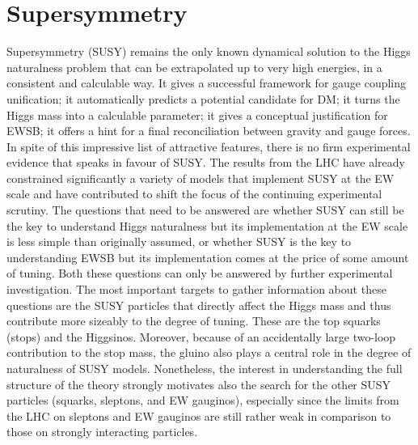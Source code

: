 \documentclass[../report.tex]{subfiles}
\begin{document}
\newcommand{\gl}{\ensuremath{\tilde{g}}}
\newcommand{\tone}{\ensuremath{\tilde{t}_1}}
\newcommand{\neut}{\ensuremath{\tilde{\chi}}}
\newcommand{\stopq}{\ensuremath{\tilde{t}}}
\newcommand{\chiOneZero}{\ensuremath{\tilde{\chi}_1^0}}
\newcommand{\chiTwoZero}{\ensuremath{\tilde{\chi}_2^0}}
\newcommand{\chiOnePM}{\ensuremath{\tilde{\chi}_1^\pm}}
\newcommand{\chiOneMP}{\ensuremath{\tilde{\chi}_1^\mp}}
\newcommand{\Ptmiss}{\ensuremath{p_T^{miss}}}
\newcommand{\Dmstop}{\ensuremath{\Delta m(\stopq,\chiOneZero)}}

\section{Supersymmetry}
\label{sec:BSM-SUSY}

Supersymmetry (SUSY) remains the only known dynamical solution to the Higgs naturalness problem that can be extrapolated up to very high energies, in a consistent and calculable way. It gives a successful framework for gauge coupling unification; it automatically predicts a potential candidate for DM; it turns the Higgs mass into a calculable parameter; it gives a conceptual justification for EWSB; it offers a hint for a final reconciliation between gravity and gauge forces. In spite of this impressive list of attractive features, there is no firm experimental evidence that speaks in favour of SUSY. The results from the LHC have already constrained significantly a variety of models that implement SUSY at the EW scale and have contributed to shift the focus of the continuing experimental scrutiny. The questions that need to be answered are whether SUSY can still be the key to understand Higgs naturalness but its implementation at the EW scale is less simple than originally assumed, or whether SUSY is the key to understanding EWSB but its implementation comes at the price of some amount of tuning. Both these questions can only be answered by further experimental investigation. The most important targets to gather information about these questions are the SUSY particles that directly affect the Higgs mass and thus contribute more sizeably to the degree of tuning. These are the top squarks (stops) and the Higgsinos. Moreover, because of an accidentally large two-loop contribution to the stop mass, the gluino also plays a central role in the degree of naturalness of SUSY models. Nonetheless, the interest in understanding the full structure of the theory strongly motivates also the search for the other SUSY particles (squarks, sleptons, and EW gauginos), especially since the limits from the LHC on sleptons and EW gauginos are still rather weak in comparison to those on strongly interacting particles.   
\end{document}
